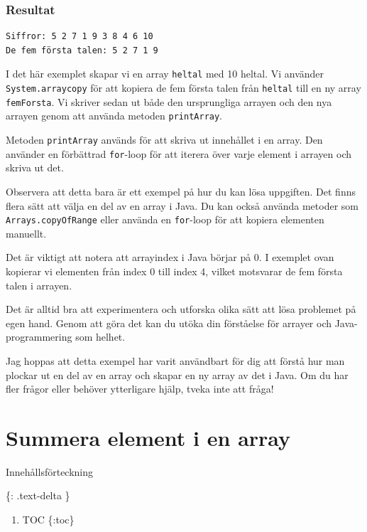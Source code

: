 \hypertarget{resultat}{%
\subsubsection{Resultat}\label{resultat}}

\begin{verbatim}
Siffror: 5 2 7 1 9 3 8 4 6 10
De fem första talen: 5 2 7 1 9
\end{verbatim}

I det här exemplet skapar vi en array \texttt{heltal} med 10 heltal. Vi
använder \texttt{System.arraycopy} för att kopiera de fem första talen
från \texttt{heltal} till en ny array \texttt{femForsta}. Vi skriver
sedan ut både den ursprungliga arrayen och den nya arrayen genom att
använda metoden \texttt{printArray}.

Metoden \texttt{printArray} används för att skriva ut innehållet i en
array. Den använder en förbättrad \texttt{for}-loop för att iterera över
varje element i arrayen och skriva ut det.

Observera att detta bara är ett exempel på hur du kan lösa uppgiften.
Det finns flera sätt att välja en del av en array i Java. Du kan också
använda metoder som \texttt{Arrays.copyOfRange} eller använda en
\texttt{for}-loop för att kopiera elementen manuellt.

Det är viktigt att notera att arrayindex i Java börjar på 0. I exemplet
ovan kopierar vi elementen från index 0 till index 4, vilket motsvarar
de fem första talen i arrayen.

Det är alltid bra att experimentera och utforska olika sätt att lösa
problemet på egen hand. Genom att göra det kan du utöka din förståelse
för arrayer och Java-programmering som helhet.

Jag hoppas att detta exempel har varit användbart för dig att förstå hur
man plockar ut en del av en array och skapar en ny array av det i Java.
Om du har fler frågor eller behöver ytterligare hjälp, tveka inte att
fråga!

\hypertarget{summera-element-i-en-array}{%
\section{Summera element i en array}\label{summera-element-i-en-array}}

Innehållsförteckning

\{: .text-delta \}

\begin{enumerate}
\def\labelenumi{\arabic{enumi}.}
\tightlist
\item
  TOC \{:toc\}
\end{enumerate}

